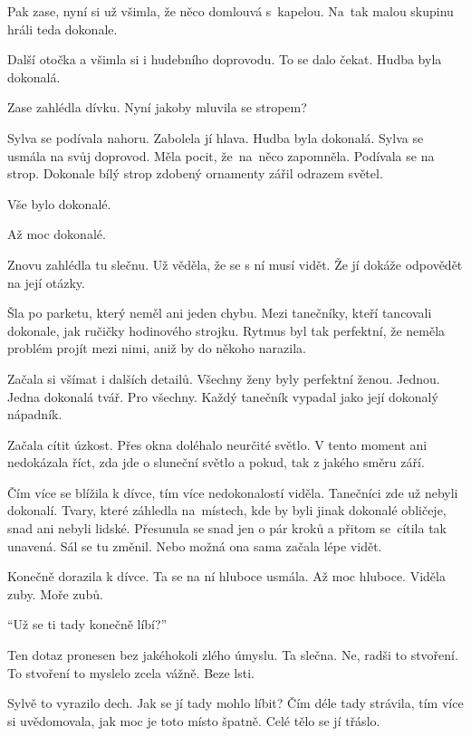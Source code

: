 \documentclass[10pt]{article}
\begin{document}
\begin{spacing}{1}
	Pak zase, nyní si už všimla, že něco domlouvá s~kapelou.
	Na~tak malou skupinu hráli teda dokonale.\par
	Další otočka a všimla si i hudebního doprovodu.
	To se dalo čekat.
	Hudba byla dokonalá.\par
	Zase zahlédla dívku.
	Nyní jakoby mluvila se stropem?\par
	Sylva se podívala nahoru.
	Zabolela jí hlava.
	Hudba byla dokonalá.
	Sylva se usmála na svůj doprovod.
	Měla pocit, že~na~něco zapomněla.
	Podívala se na strop.
	Dokonale bílý strop zdobený ornamenty zářil odrazem světel.\par
	Vše bylo dokonalé.\par
	Až moc dokonalé.\par
	Znovu zahlédla tu slečnu.
	Už věděla, že se s ní musí vidět.
	Že jí dokáže odpovědět na její otázky.\par
	Šla po parketu, který neměl ani jeden chybu.
	Mezi tanečníky, kteří tancovali dokonale, jak ručičky hodinového strojku.
	Rytmus byl tak perfektní, že neměla problém projít mezi nimi, aniž by do někoho narazila.\par
	Začala si všímat i dalších detailů.
	Všechny ženy byly perfektní ženou.
	Jednou.
	Jedna dokonalá tvář.
	Pro všechny.
	Každý tanečník vypadal jako její dokonalý nápadník.\par
	Začala cítit úzkost.
	Přes okna doléhalo neurčité světlo.
	V tento moment ani nedokázala říct, zda jde o sluneční světlo a pokud, tak z jakého směru září.\par
	Čím více se blížila k dívce, tím více nedokonalostí viděla.
	Tanečníci zde už nebyli dokonalí.
	Tvary, které záhledla na~místech, kde by byli jinak dokonalé obličeje, snad ani nebyli lidské.
	Přesunula se snad jen o pár kroků a přitom se~cítila tak unavená.
	Sál se tu změnil.
	Nebo možná ona sama začala lépe vidět.\par
	\vspace{1em}\par
	Konečně dorazila k dívce.
	Ta se na ní hluboce usmála.
	Až moc hluboce.
	Viděla zuby.
	Moře zubů.\par
	\enquote{Už se ti tady konečně líbí?}\par
	Ten dotaz pronesen bez jakéhokoli zlého úmyslu.
	Ta slečna.
	Ne, radši to stvoření.
	To stvoření to myslelo zcela vážně.
	Beze lsti.\par
	Sylvě to vyrazilo dech.
	Jak se jí tady mohlo líbit?
	Čím déle tady strávila, tím více si uvědomovala, jak moc je toto místo špatně.
	Celé tělo se jí třáslo.

\end{spacing}
\end{document}

